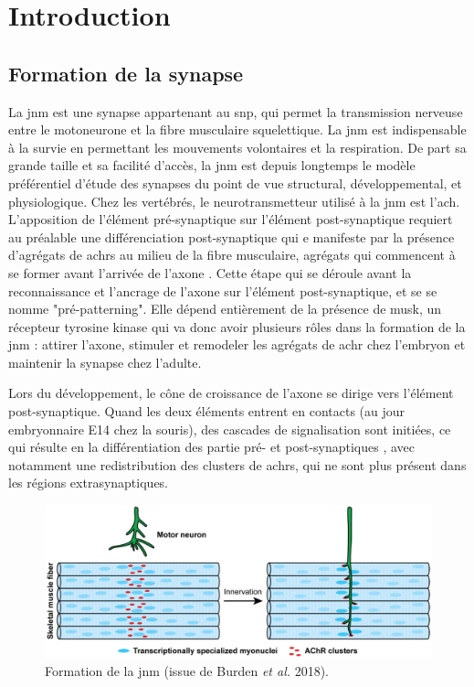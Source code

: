 \chapter{Introduction}

\section{Formation de la synapse}
	\label{sec:IntroSynapse}
	La \gls{jnm} est une synapse appartenant au \gls{snp}, qui permet la transmission nerveuse entre le motoneurone et la fibre musculaire squelettique. La \gls{jnm} est indispensable à la survie en permettant les mouvements volontaires et la respiration. De part sa grande taille et sa facilité d'accès, la \gls{jnm} est depuis longtemps le modèle préférentiel d'étude des synapses du point de vue structural, développemental, et physiologique. Chez les vertébrés, le neurotransmetteur utilisé à la \gls{jnm} est l'\gls{ach}. L'apposition de l'élément pré-synaptique sur l'élément post-synaptique requiert au préalable une différenciation post-synaptique qui e manifeste par la présence d'agrégats de \glspl{achr} au milieu de la fibre musculaire, agrégats qui commencent à se former avant l'arrivée de l'axone \cite{Wu2010a, Gordon2012}. Cette étape qui se déroule avant la reconnaissance et l'ancrage de l'axone sur l'élément post-synaptique, et se se nomme "pré-patterning". Elle dépend entièrement de la présence de \acrshort{musk}, un récepteur tyrosine kinase qui va donc avoir plusieurs rôles dans la formation de la \gls{jnm} : attirer l'axone, stimuler et remodeler les agrégats de \gls{achr} chez l'embryon et maintenir la synapse chez l'adulte.
	
	Lors du développement, le cône de croissance de l'axone se dirige vers l'élément post-synaptique. Quand les deux éléments entrent en contacts (au jour embryonnaire E14 chez la souris), des cascades de signalisation sont initiées, ce qui résulte en la différentiation des partie pré- et post-synaptiques \cite{Sanes1999}, avec notamment une redistribution des clusters de \glspl{achr}, qui ne sont plus présent dans les régions extrasynaptiques.
	
	\begin{figure}
		\includegraphics[width=\textwidth]{./Images/formation_jnm.png}
		\caption{Formation de la \gls{jnm} (issue de Burden \emph{et al.} 2018).}
		\label{fig:FormaJNM}
	\end{figure}
	\clearpage
	
